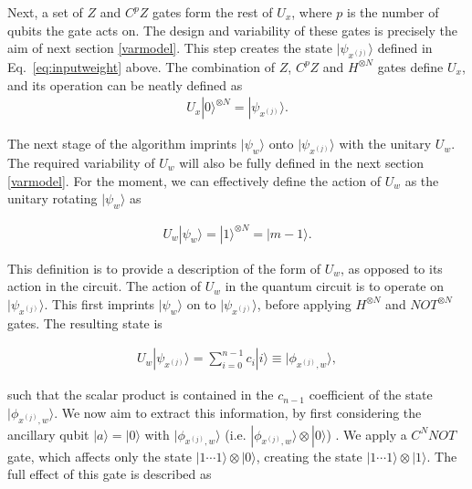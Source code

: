 \documentclass[twocolumn,superscriptaddress]{revtex4-1}
\begin{document}
Next, a set of $Z$ and $C^pZ$ gates form the rest of $U_x$, where $p$ is the number of qubits the gate acts on. The design and variability of these gates is precisely the aim of next section \ref{varmodel}. This step creates the state $| {\psi}_{x^{(j)}} \rangle $ defined in Eq.~\ref{eq:inputweight} above. The combination of $Z$, $C^pZ$ and $H^{\otimes N}$ gates define $U_x$, and its operation can be neatly defined as 
\begin{equation} \label{eq:firstunitary}
\begin{split}
U_x |0 \rangle ^{\otimes N} = | {\psi}_{x^{(j)}} \rangle .
\end{split}
\end{equation}

The next stage of the algorithm imprints $| \psi_w \rangle$ onto $| {\psi}_{x^{(j)}} \rangle$ with the unitary $U_w$. The required variability of $U_w$ will also be fully defined in the next section \ref{varmodel}. For the moment, we can effectively define the action of $U_w$ as the unitary rotating $|\psi _w \rangle$ as

\begin{equation} \label{eq:weightunitary}
\begin{split}
U_w |\psi _w \rangle = |1 \rangle ^{\otimes N} = |m-1 \rangle.
\end{split}
\end{equation}

This definition is to provide a description of the form of $U_w$, as opposed to its action in the circuit. The action of $U_w$ in the quantum circuit is to operate on $| {\psi}_{x^{(j)}} \rangle$. This first imprints $|\psi _w \rangle$ on to $| {\psi}_{x^{(j)}} \rangle$, before applying $H^{\otimes N}$ and $NOT^{\otimes N}$ gates. The resulting state is

\begin{equation} \label{eq:secondunitary}
\begin{split}
U_w | \psi_{x^{(j)}} \rangle = \sum_{i=0}^{n-1} c_i |i \rangle \equiv |\phi_{x^{(j)},w} \rangle,
\end{split}
\end{equation}

such that the scalar product is contained in the $c_{n-1}$ coefficient of the state $|\phi_{x^{(j)},w} \rangle$. We now aim to extract this information, by first considering the ancillary qubit $|a \rangle = |0 \rangle$ with $|\phi_{x^{(j)},w} \rangle$ (i.e. $|\phi_{x^{(j)},w} \rangle \otimes |0 \rangle$) . We apply a $C^N NOT$ gate, which affects only the state $|1 \cdots 1  \rangle \otimes |0 \rangle$, creating the state $|1 \cdots 1 \rangle \otimes |1 \rangle$. The full effect of this gate is described as
\end{document}
